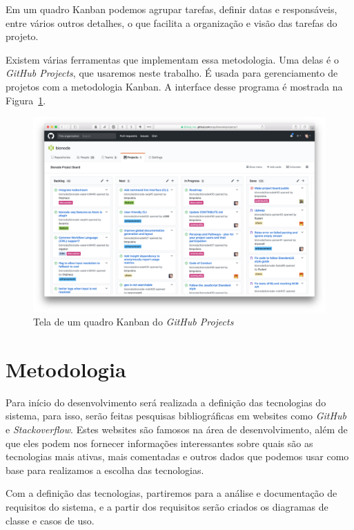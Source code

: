 \documentclass[12pt]{article}
\begin{document}
Em um quadro Kanban podemos agrupar tarefas, definir datas e responsáveis, entre vários outros
detalhes, o que facilita a organização e visão das tarefas do projeto.

Existem várias ferramentas que implementam essa metodologia.
Uma delas é o \emph{GitHub Projects}, que usaremos neste trabalho. É usada para gerenciamento de projetos
com a metodologia Kanban. A interface desse programa é mostrada na Figura~\ref{fig:github-board}.

\begin{figure}[H]
  \centering
  \includegraphics[width=1\textwidth]{github/github-board.png}
  \caption{Tela de um quadro Kanban do \emph{GitHub Projects}}\label{fig:github-board}
\end{figure}



\section{Metodologia}

Para início do desenvolvimento será realizada a definição das tecnologias do sistema, para isso, serão feitas
pesquisas bibliográficas em websites como \textit{GitHub} e \textit{Stackoverflow}. Estes websites
são famosos na área de desenvolvimento, além de que eles podem nos fornecer informações interessantes sobre quais
são as tecnologias mais ativas, mais comentadas e outros dados que podemos usar como base para realizamos
a escolha das tecnologias.

Com a definição das tecnologias, partiremos para a análise e documentação de requisitos do sistema, e a partir
dos requisitos serão criados os diagramas de classe e casos de uso.
\end{document}
